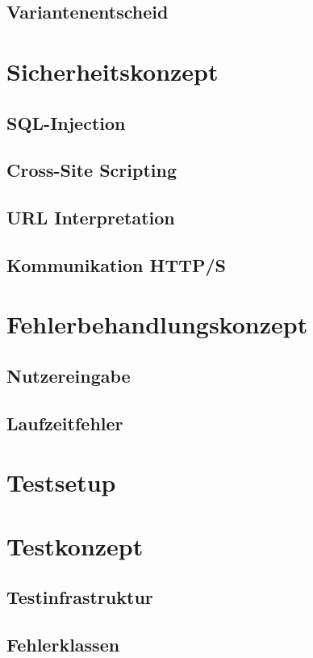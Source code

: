 \subsection{Variantenentscheid}

\section{Sicherheitskonzept}
\subsection{SQL-Injection}
\subsection{Cross-Site Scripting}
\subsection{URL Interpretation}
\subsection{Kommunikation HTTP/S}

\section{Fehlerbehandlungskonzept}
\subsection{Nutzereingabe}
\subsection{Laufzeitfehler}

\section{Testsetup}

\section{Testkonzept}
\subsection{Testinfrastruktur}
\subsection{Fehlerklassen}
